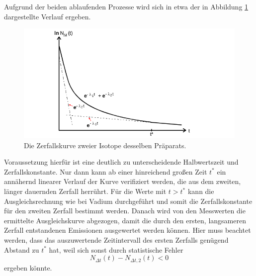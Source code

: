Aufgrund der beiden ablaufenden Prozesse wird sich in etwa der in Abbildung \ref{fig:zweiZerfaelle} dargestellte Verlauf ergeben. 
\begin{figure}
    \centering
    \includegraphics[width=\textwidth]{plots/zweiZerfaelle.png}
    \caption{Die Zerfallskurve zweier Isotope desselben Präparats\cite{Versuchsanleitung}.}
    \label{fig:zweiZerfaelle}
\end{figure}
Voraussetzung hierfür ist eine deutlich zu unterscheidende Halbwertszeit und Zerfallskonstante. 
Nur dann kann ab einer hinreichend großen Zeit $t^*$ ein annähernd linearer Verlauf der Kurve verifiziert werden, die 
aus dem zweiten, länger dauernden Zerfall herrührt. Für die Werte mit $t>t^*$ kann die Ausgleichsrechnung wie bei Vadium 
durchgeführt und somit die Zerfallskonstante für den zweiten Zerfall bestimmt werden. 
Danach wird von den Messwerten die ermittelte Ausgleichskurve abgezogen, damit die durch den ersten, langsameren Zerfall 
entstandenen Emissionen ausgewertet werden können. 
Hier muss beachtet werden, dass das auszuwertende Zeitintervall des ersten Zerfalls genügend Abstand zu $t^*$ hat, weil sich 
sonst durch statistische Fehler 
\begin{equation*}
    N_{\Delta t}(t)-N_{\Delta t,2}(t) <0
\end{equation*}
ergeben könnte\cite{Versuchsanleitung}.